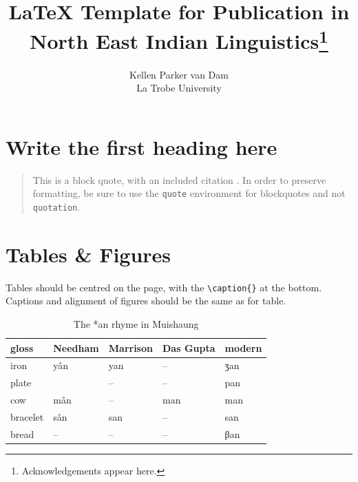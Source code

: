 


\title{LaTeX Template for Publication in North East Indian Linguistics\footnote{Acknowledgements appear here.}}

\author{Kellen Parker van Dam\\La Trobe University}

\maketitle


\section{Write the first heading here}

\lipsum[1]

\begin{quote}
	This is a block quote, with an included citation \autocite{morey2018verbstemalternation}. In order to preserve formatting, be sure to use the \texttt{quote} environment for blockquotes and not \texttt{quotation}.
\end{quote}

\lipsum[5]

\section{Tables \& Figures}

\lipsum[6]

Tables should be centred on the page, with the \texttt{\textbackslash caption\{\}} at the bottom. Captions and alignment of figures should be the same as for table.

\begin{table}[htpb!]
	\centering
	\begin{tabular}{@{}lllll@{}}
	\toprule
	gloss & Needham & Marrison & Das Gupta & modern \\ \midrule
	iron & yân & yan & -- & ʒan \\
	plate &  & -- & -- & pan \\
	cow & mân & -- & man & man \\
	bracelet & sân & san & -- & san \\
	bread & -- & -- & -- & βan \\ \bottomrule
	\end{tabular}
	\caption{The *an rhyme in Muishaung}
	\label{tab:an}
\end{table}

